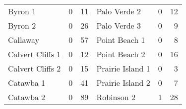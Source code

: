 \documentclass {book}
\begin{document}
\begin{enumerate}[\ref{ch10}.1]
\begin{table}
\begin{tabular}{lcr |lcr}
Byron 1          & {\hspace{0.1in}}0\mbox{\hspace{0.1in}} & 11\phantom{*}   &{\hspace{0.1in}}Palo Verde 2     & {\hspace{0.1in}}0\mbox{\hspace{0.1in}} & 12\\
Byron 2          & {\hspace{0.1in}}0\mbox{\hspace{0.1in}} & 26\phantom{*}   &{\hspace{0.1in}}Palo Verde 3     & {\hspace{0.1in}}0\mbox{\hspace{0.1in}} & 9\\
Callaway         & {\hspace{0.1in}}0\mbox{\hspace{0.1in}} & 57\phantom{*}   &{\hspace{0.1in}}Point Beach 1    & {\hspace{0.1in}}0\mbox{\hspace{0.1in}} & 8\\
Calvert Cliffs 1 & {\hspace{0.1in}}0\mbox{\hspace{0.1in}} & 12\phantom{*}   &{\hspace{0.1in}}Point Beach 2    & {\hspace{0.1in}}0\mbox{\hspace{0.1in}} & 16\\
Calvert Cliffs 2 & {\hspace{0.1in}}0\mbox{\hspace{0.1in}} & 15\phantom{*}   &{\hspace{0.1in}}Prairie Island 1 & {\hspace{0.1in}}0\mbox{\hspace{0.1in}} & 3\\
Catawba 1        & {\hspace{0.1in}}0\mbox{\hspace{0.1in}} & 41\phantom{*}   &{\hspace{0.1in}}Prairie Island 2 & {\hspace{0.1in}}0\mbox{\hspace{0.1in}} & 7\\
Catawba 2        & {\hspace{0.1in}}0\mbox{\hspace{0.1in}} & 89\phantom{*}   &{\hspace{0.1in}}Robinson 2       & {\hspace{0.1in}}1\mbox{\hspace{0.1in}} & 28\\

\end{tabular}
\end{table}
\end{enumerate}
\end{document}
